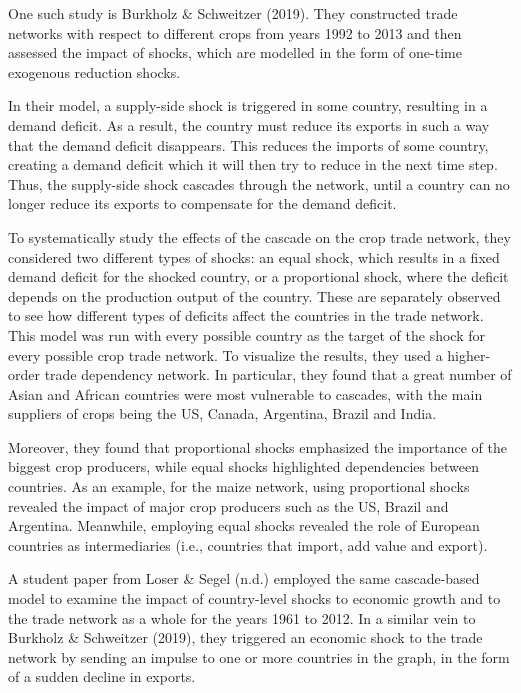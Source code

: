 \documentclass[12pt,letterpaper]{report}
\begin{document}
	One such study is Burkholz \& Schweitzer (2019). They constructed trade networks with respect to different crops from years 1992 to 2013 and then assessed the impact of shocks, which are modelled in the form of one-time exogenous reduction shocks. 
	
	In their model, a supply-side shock is triggered in some country, resulting in a demand deficit. As a result, the country must reduce its exports in such a way that the demand deficit disappears. This reduces the imports of some country, creating a demand deficit which it will then try to reduce in the next time step. Thus, the supply-side shock cascades through the network, until a country can no longer reduce its exports to compensate for the demand deficit.
	
	To systematically study the effects of the cascade on the crop trade network, they considered two different types of shocks: an equal shock, which results in a fixed demand deficit for the shocked country, or a proportional shock, where the deficit depends on the production output of the country. These are separately observed to see how different types of deficits affect the countries in the trade network. This model was run with every possible country as the target of the shock for every possible crop trade network. To visualize the results, they used a higher-order trade dependency network. In particular, they found that a great number of Asian and African countries were most vulnerable to cascades, with the main suppliers of crops being the US, Canada, Argentina, Brazil and India.
	
	Moreover, they found that proportional shocks emphasized the importance of the biggest crop producers, while equal shocks highlighted dependencies between countries. As an example, for the maize network, using proportional shocks revealed the impact of major crop producers such as the US, Brazil and Argentina. Meanwhile, employing equal shocks revealed the role of European countries as intermediaries (i.e., countries that import, add value and export).
	
	A student paper from Loser \& Segel (n.d.) employed the same cascade-based model to examine the impact of country-level shocks to economic growth and to the trade network as a whole for the years 1961 to 2012. In a similar vein to Burkholz \& Schweitzer (2019), they triggered an economic shock to the trade network by sending an impulse to one or more countries in the graph, in the form of a sudden decline in exports. 
	
\end{document}

